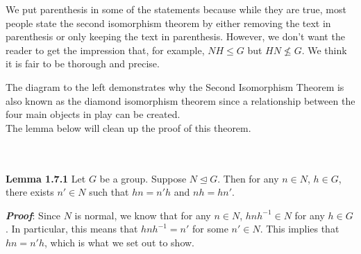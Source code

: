 \documentclass[12pt,letterpaper]{algebra_book}
\newcommand{\normal}{\unlhd}
\theoremstyle{definition}
\begin{document}
    We put parenthesis in some of the statements because
    while they are true, most people state the second isomorphism
    theorem by either removing the text in parenthesis or only keeping
    the text in parenthesis. However, we don't want the reader to get
    the impression that, for example, $NH \le G$ but $HN \not\le G$.
    We think it is fair to be thorough and precise.
    \begin{minipage}{0.25 \textwidth}
        \begin{figure}[H]
        \end{figure}
    \end{minipage} \hfill
    \begin{minipage}{0.7\textwidth}
        The diagram to the left demonstrates why the Second
        Isomorphism Theorem is also known as the diamond isomorphism
        theorem since a relationship between the four main
        objects in play can be created. 
        \\
        The lemma below will clean up the proof of this theorem.
    \end{minipage}  
    \\
    \\

    \noindent\textbf{Lemma 1.7.1} Let $G$ be a group. Suppose
    $N \normal G$. Then for any $n \in N$, $h \in
    G$, there exists $n' \in N$ such that $hn = n'h$ and $nh = hn'$.

    \textbf{\textit{Proof}}: Since $N$ is normal, we know that for any
    $n \in N$,
    $hnh^{-1} \in N$ for any $h \in G$. In particular, this means that
    $hnh^{-1} = n'$ for some $n' \in N$. This implies that $hn = n'h$,
    which is what we set out to show.
    \\
\end{document}
